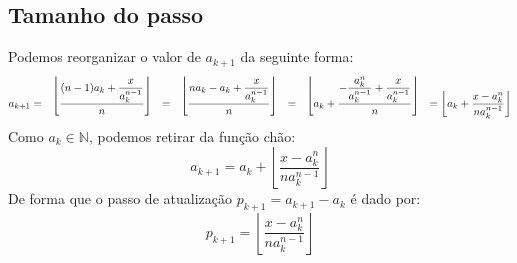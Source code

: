 \subsection*{Tamanho do passo}

Podemos reorganizar o valor de $a_{k+1}$ da seguinte forma:
\[
  a_{k+1}
  = \bracketize[.75em]{\lfloor}{\rfloor}{
      \dfrac{(n-1) a_k + \dfrac{x}{a_k^{n-1}}}{n}
    }
  = \bracketize[.75em]{\lfloor}{\rfloor}{
      \dfrac{n a_k - a_k + \dfrac{x}{a_k^{n-1}}}{n}
    }
  = \bracketize[.75em]{\lfloor}{\rfloor}{
      a_k +
      \dfrac{- \dfrac{a_k^n}{a_k^{n-1}} + \dfrac{x}{a_k^{n-1}}}
            {n}
    }
  = \left\lfloor
      a_k +
      \dfrac{x - a_k^n}{na_k^{n-1}}
    \right\rfloor
\]
Como $a_k \in \mathds{N}$, podemos retirar da função chão:
\[
  a_{k+1}
  = a_k +
    \left\lfloor
      \dfrac{x - a_k^n}{na_k^{n-1}}
    \right\rfloor
\]
De forma que o passo de atualização $p_{k+1} = a_{k+1} - a_{k}$
é dado por:
\[
  p_{k+1} = \left\lfloor \dfrac{x - a_k^n}{na_k^{n-1}} \right\rfloor
\]
